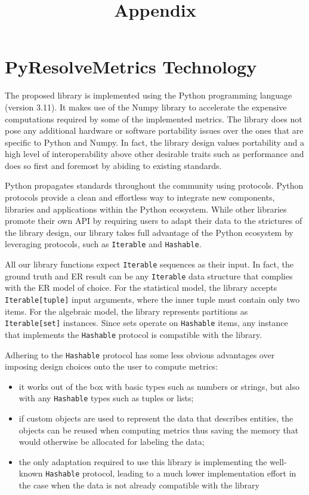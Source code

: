 \documentclass[a4paper,twoside]{article}
\begin{document}
\title{Appendix}
\section{PyResolveMetrics Technology}\label{appendix:technology}
    The proposed library is implemented using the Python programming
    language (version 3.11)\cite{python}.
    It makes use of the Numpy library\cite{harris2020numpy} to accelerate
    the expensive computations required by some of the implemented metrics.
    The library does not pose any additional hardware or software portability
    issues over the ones that are specific to Python and Numpy.
    In fact, the library design values portability and a high level of
    interoperability above other desirable traits such as performance and does
    so first and foremost by abiding to existing standards.

    Python propagates standards throughout the community using protocols.
    Python protocols\cite{pyproto2017} provide a clean and effortless way to
    integrate new components, libraries and applications within the Python
    ecosystem.
    While other libraries\cite{nmeth2020scipy} promote their own API by
    requiring users to adapt their data to the strictures of the library design,
    our library takes full advantage of the Python ecosystem by leveraging
    protocols, such as \texttt{Iterable} and \texttt{Hashable}.

    All our library functions expect \texttt{Iterable} sequences as their input.
    In fact, the ground truth and ER result can be any
    \texttt{Iterable} data structure that complies with the ER
    model of choice.
    For the statistical model, the library accepts \texttt{Iterable[tuple]}
    input arguments, where the inner tuple must contain only two items.
    For the algebraic model, the library represents partitions as
    \texttt{Iterable[set]} instances.
    Since sets operate on \texttt{Hashable} items, any instance that implements
    the \texttt{Hashable} protocol is compatible with the library.
    
    Adhering to the \texttt{Hashable} protocol has some less obvious advantages
    over imposing design choices onto the user to compute metrics:
    \begin{itemize}
        \item it works out of the box with basic types such as numbers or
        strings, but also with any \texttt{Hashable} types such as tuples or
        lists;
        \item if custom objects are used to represent the data that describes
        entities, the objects can be reused when computing metrics thus saving
        the memory that would otherwise be allocated for labeling the data;
        \item the only adaptation required to use this library is implementing
        the well-known \texttt{Hashable} protocol, leading to a much lower
        implementation effort in the case when the data is not already
        compatible with the library\@
    \end{itemize}
\end{document}
